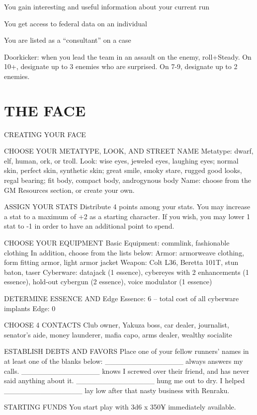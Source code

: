 You gain interesting and useful information about your current run

You get access to federal data on an individual

You are listed as a “consultant” on a case

Doorkicker: when you lead the team in an assault on the enemy, roll+Steady. On 10+, designate up to 3 enemies who are surprised. On 7-9, designate up to 2 enemies.



\clearpage
\section{THE FACE}
CREATING YOUR FACE

CHOOSE YOUR METATYPE, LOOK, AND STREET NAME
Metatype: dwarf, elf, human, ork, or troll.
Look: wise eyes, jeweled eyes, laughing eyes; normal skin, perfect skin, synthetic skin; great smile, smoky stare, rugged good looks, regal bearing; fit body, compact body, androgynous body
Name: choose from the GM Resources section, or create your own.

ASSIGN YOUR STATS
Distribute 4 points among your stats. You may increase a stat to a maximum of +2 as a starting character. If you wish, you may lower 1 stat to -1 in order to have an additional point to spend.

CHOOSE YOUR EQUIPMENT
Basic Equipment: commlink, fashionable clothing
In addition, choose from the lists below:
Armor: armorweave clothing, form fitting armor, light armor jacket
Weapon: Colt L36, Beretta 101T, stun baton, taser
Cyberware: datajack (1 essence), cybereyes with 2 enhancements (1 essence), hold-out cybergun (2 essence), voice modulator (1 essence)

DETERMINE ESSENCE AND Edge
Essence: 6 – total cost of all cyberware implants
Edge: 0

CHOOSE 4 CONTACTS
Club owner, Yakuza boss, car dealer, journalist, senator’s aide, money launderer, mafia capo, arms dealer, wealthy socialite

ESTABLISH DEBTS AND FAVORS
Place one of your fellow runners’ names in at least one of the blanks below:
\_\_\_\_\_\_\_\_\_\_\_\_\_\_\_ always answers my calls.
\_\_\_\_\_\_\_\_\_\_\_\_\_\_\_ knows I screwed over their friend, and has never said anything about it.
\_\_\_\_\_\_\_\_\_\_\_\_\_\_\_ hung me out to dry.
I helped \_\_\_\_\_\_\_\_\_\_\_\_\_\_\_ lay low after that nasty business with Renraku.

STARTING FUNDS
You start play with 3d6 x 350¥ immediately available.

